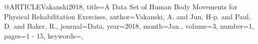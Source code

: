 @ARTICLE{Vakanski2018,
title={A Data Set of Human Body Movements for Physical Rehabilitation Exercises},
author={Vakanski, A. and Jun, H-p. and Paul, D. and Baker, R.},
journal={Data}, 
year={2018},
month={Jan.},
volume={3},
number={1},
pages={1 - 15},
keywords={},
}
